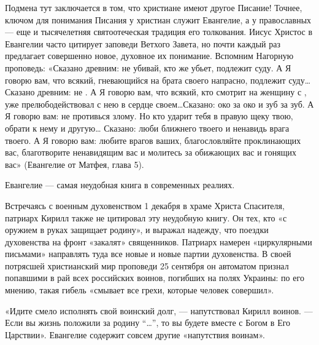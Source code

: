 Подмена тут заключается в том, что христиане имеют другое Писание! Точнее, ключом для понимания Писания у христиан служит Евангелие, а у православных — еще и тысячелетняя святоотеческая традиция его толкования. Иисус Христос в Евангелии часто цитирует заповеди Ветхого Завета, но почти каждый раз предлагает совершенно новое, духовное их понимание. Вспомним Нагорную проповедь: «Сказано древним: не убивай, кто же убьет, подлежит суду. А Я говорю вам, что всякий, гневающийся на брата своего напрасно, подлежит суду… Сказано древним: не . А Я говорю вам, что всякий, кто смотрит на женщину с , уже прелюбодействовал с нею в сердце своем\dots Сказано: око за око и зуб за зуб. А Я говорю вам: не противься злому. Но кто ударит тебя в правую щеку твою, обрати к нему и другую… Сказано: люби ближнего твоего и ненавидь врага твоего. А Я говорю вам: любите врагов ваших, благословляйте проклинающих вас, благотворите ненавидящим вас и молитесь за обижающих вас и гонящих вас» (Евангелие от Матфея, глава 5).


\begin{fancyquotes}
    Евангелие — самая неудобная книга в современных реалиях.
\end{fancyquotes}

Встречаясь с военным духовенством 1 декабря в храме Христа Спасителя, патриарх Кирилл также не цитировал эту неудобную книгу. Он   тех, кто «с оружием в руках защищает родину», и выражал надежду, что поездки духовенства на фронт «закалят» священников. Патриарх намерен «циркулярными письмами» направлять туда все новые и новые партии духовенства. В своей потрясшей христианский мир проповеди 25 сентября он автоматом признал попавшими в рай всех российских воинов, погибших на полях Украины: по его мнению, такая гибель «смывает все грехи, которые человек совершил».

\begin{fancyquotes}
    «Идите смело исполнять свой воинский долг, — напутствовал Кирилл воинов. — Если вы жизнь положили за родину ``\dots'', то вы будете вместе с Богом в Его Царствии».
    Евангелие содержит совсем другие «напутствия воинам».
\end{fancyquotes}


